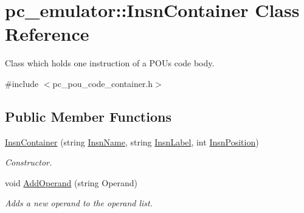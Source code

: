 \hypertarget{classpc__emulator_1_1InsnContainer}{}\section{pc\+\_\+emulator\+:\+:Insn\+Container Class Reference}
\label{classpc__emulator_1_1InsnContainer}


Class which holds one instruction of a P\+OU\textquotesingle{}s code body.  




{\ttfamily \#include $<$pc\+\_\+pou\+\_\+code\+\_\+container.\+h$>$}

\subsection*{Public Member Functions}
\begin{DoxyCompactItemize}
\item 
\hyperlink{classpc__emulator_1_1InsnContainer_a054bf743b4cd9d86d066a69033488785}{Insn\+Container} (string \hyperlink{classpc__emulator_1_1InsnContainer_a4f55c833c6ab4088ccb9be1e35638da9}{Insn\+Name}, string \hyperlink{classpc__emulator_1_1InsnContainer_a4fef8845e6a7f568884044b8db0abce5}{Insn\+Label}, int \hyperlink{classpc__emulator_1_1InsnContainer_a682a1868ddc3693127e0903676a3d137}{Insn\+Position})\hypertarget{classpc__emulator_1_1InsnContainer_a054bf743b4cd9d86d066a69033488785}{}\label{classpc__emulator_1_1InsnContainer_a054bf743b4cd9d86d066a69033488785}

\begin{DoxyCompactList}\small\item\em Constructor. \end{DoxyCompactList}\item 
void \hyperlink{classpc__emulator_1_1InsnContainer_a4f2aca845465f3086e94080390123b2d}{Add\+Operand} (string Operand)\hypertarget{classpc__emulator_1_1InsnContainer_a4f2aca845465f3086e94080390123b2d}{}\label{classpc__emulator_1_1InsnContainer_a4f2aca845465f3086e94080390123b2d}

\begin{DoxyCompactList}\small\item\em Adds a new operand to the operand list. \end{DoxyCompactList}\end{DoxyCompactItemize}
